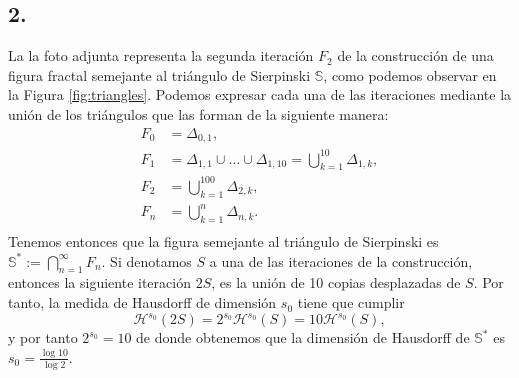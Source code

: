 \documentclass[11pt,a4paper]{article}
\begin{document}
\newpage
\subsection*{2.}


La la foto adjunta representa la segunda iteración $ F_2 $ de la construcción de una figura fractal semejante al triángulo de Sierpinski $ \mathbb S $, como podemos observar en la Figura \ref{fig:triangles}. Podemos expresar cada una de las iteraciones mediante la unión de los triángulos que las forman de la siguiente manera:
\begin{align*}
  F_0 &= \Delta_{0,1}, \\ 
  F_1 &= \Delta_{1,1} \cup \dots \cup \Delta_{1,10} = \bigcup_{k=1}^{10} \Delta_{1, k}, \\
  F_2 &= \bigcup_{k=1}^{100} \Delta_{2, k}, \\
  F_n &= \bigcup_{k=1}^{n} \Delta_{n, k}. \\
\end{align*}
Tenemos entonces que la figura semejante al triángulo de Sierpinski es $ \mathbb S^* := \bigcap_{n=1}^\infty F_n $. Si denotamos $ S $ a una de las iteraciones de la construcción, entonces la siguiente iteración $ 2S $, es la unión de 10 copias desplazadas de $ S $. Por tanto, la medida de Hausdorff de dimensión $ s_0 $ tiene que cumplir
$$
  \mathcal H^{s_0} (2S) = 2^{s_0} \mathcal H^{s_0} (S) = 10 \mathcal H^{s_0} (S),
$$
y por tanto $ 2^{s_0} = 10 $ de donde obtenemos que la dimensión de Hausdorff de $ \mathbb S^* $ es $ s_0 = \frac{\log 10}{\log 2} $.
\end{document}
